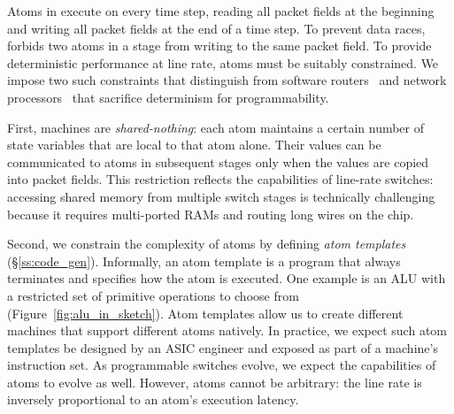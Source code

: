 
Atoms in \absmachine execute on every time step, reading all packet fields at
the beginning and writing all packet fields at the end of a time step. To
prevent data races, \absmachine forbids two atoms in a stage from writing to
the same packet field.  To provide deterministic performance at line rate,
atoms must be suitably constrained.  We impose two such constraints that
distinguish \absmachine from software routers~\cite{click} and network
processors~\cite{ixp4xx} that sacrifice determinism for programmability.

First, \absmachine machines are \textit{shared-nothing}: each atom maintains a
certain number of state variables that are local to that atom alone. Their
values can be communicated to atoms in subsequent stages only when the values
are copied into packet fields. This restriction reflects the capabilities of
line-rate switches: accessing shared memory from multiple switch stages is
technically challenging because it requires multi-ported RAMs and routing long
wires on the chip.

Second, we constrain the complexity of atoms by defining {\it atom templates}
(\S\ref{ss:code_gen}).  Informally, an atom template is a program that always
terminates and specifies how the atom is executed. One example is an ALU with a
restricted set of primitive operations to choose from
(Figure~\ref{fig:alu_in_sketch}). Atom templates allow us to create different
\absmachine machines that support different atoms natively. In practice, we
expect such atom templates be designed by an ASIC engineer and exposed as part
of a \absmachine machine's instruction set. As programmable switches evolve, we
expect the capabilities of atoms to evolve as well. However, atoms cannot be
arbitrary: the line rate is inversely proportional to an atom's execution
latency.
